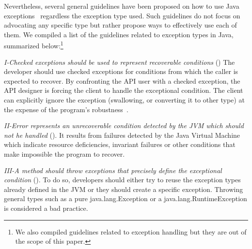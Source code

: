 \documentclass[conference]{IEEEtran}
\begin{document}
Nevertheless, several general guidelines have been proposed on how to use Java
exceptions~\cite{mandrioli1992advances,gosling2000java,wirfs2006toward,
bloch2008effective} regardless the exception type used. Such guidelines do not focus on 
advocating any specific type but rather propose ways to effectively use each of them.
 We compiled a list of the guidelines related to exception types in Java, 
summarized below:\footnote{We also compiled guidelines related
to exception handling but they are out of the scope of this paper.}


\emph{I-Checked exceptions should be used to represent recoverable
conditions} (\cite{mandrioli1992advances,gosling2000java,wirfs2006toward,bloch2008effective})
The developer should use checked exceptions for conditions from which the caller
is expected to recover. By confronting the API user with a checked exception,
the API designer is forcing the client to handle the exceptional condition. The
client can explicitly ignore the exception (swallowing, or converting it to
other type) at the expense of the program's robustness~\cite{gosling2000java}.

\emph{II-Error represents an unrecoverable condition detected by the JVM which
should not he handled} (\cite{gosling2000java}). It results from failures detected
by the Java Virtual Machine which indicate resource deficiencies, invariant
failures or other conditions that make impossible the program to recover.


\emph{III-A method should throw exceptions that precisely define the
exceptional condition} (\cite{gosling2000java,bloch2008effective}). To do so,
developers should either try to reuse the exception types already defined in the
JVM or they should create a specific exception. Throwing general types such as a
pure java.lang.Exception or a java.lang.RuntimeException is considered a bad practice.

\end{document}
